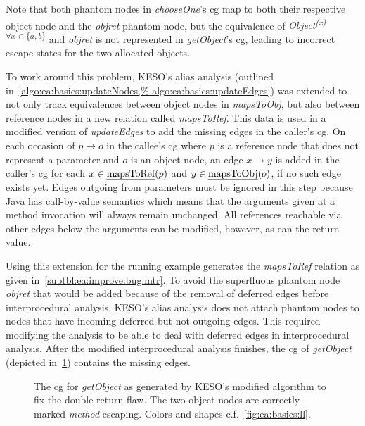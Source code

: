 			Note that both phantom nodes in \emph{chooseOne}'s \gls{cg} map to both their respective object node and the
			\emph{objret} phantom node, but the equivalence of \emph{Object\textsuperscript{(x) $\forall x \in \{a,b\}$}} and
			\emph{objret} is not represented in \emph{getObject}'s \gls{cg}, leading to incorrect escape states for the two
			allocated objects.

			To work around this problem, KESO's alias analysis (outlined in~\cref{algo:ea:basics:updateNodes,%
			algo:ea:basics:updateEdges}) was extended to not only track equivalences between object nodes in \emph{mapsToObj},
			but also between reference nodes in a new relation called \emph{mapsToRef}. This data is used in a modified
			version of \emph{updateEdges} to add the missing edges in the caller's \gls{cg}. On each occasion of
				$p \rightarrow o$
			in the callee's \gls{cg} where $p$ is a reference node that does not represent a parameter and $o$ is an object
			node, an edge
				$x \rightarrow y$
			is added in the caller's \gls{cg} for each
				$x \in \text{\emph{mapsToRef}}(p)$ and $y \in \text{\emph{mapsToObj}}(o)$,
			if no such edge exists yet. Edges outgoing from parameters must be ignored in this step because Java has
			call-by-value semantics which means that the arguments given at a method invocation will always remain unchanged.
			All references reachable via other edges below the arguments can be modified, however, as can the return value.

			Using this extension for the running example generates the \emph{mapsToRef} relation as given
			in~\cref{subtbl:ea:improve:bug:mtr}. To avoid the superfluous phantom node \emph{objret} that would be added
			because of the removal of deferred edges before interprocedural analysis, KESO's alias analysis does not attach
			phantom nodes to nodes that have incoming deferred but not outgoing edges. This required modifying the analysis to
			be able to deal with deferred edges in interprocedural analysis. After the modified interprocedural analysis
			finishes, the \gls{cg} of \emph{getObject} (depicted in~\cref{fig:ea:improve:bug:fix}) contains the missing edges.

			\begin{figure}
				\centering%

				\caption[The \gls{cg} for \emph{getObject} with the double return flaw fixed]{%
					The \gls{cg} for \emph{getObject} as generated by KESO's modified algorithm to fix the double return flaw. The
					two object nodes are correctly marked \emph{method}-escaping. Colors and shapes c.f.~\cref{fig:ea:basics:ll}.}%
				\label{fig:ea:improve:bug:fix}%
			\end{figure}

